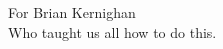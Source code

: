 \begin{dedicationpage}
  For Brian Kernighan \\
  Who taught us all how to do this.
\end{dedicationpage}
